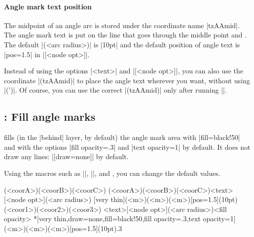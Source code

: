 \paragraph{Angle mark text position}
The midpoint of an angle arc is stored under the coordinate name |tzAAmid|.
The angle mark text is put on the line that goes through the middle point and . The default |(<arc radius>)| is |10pt| and the default position of angle text is |pos=1.5| in |[<node opt>]|.

\begin{tzcode}{.3}
\end{tzcode}

\remark Instead of using the options |{<text>}| and |[<node opt>]|, you can also use the coordinate |(tzAAmid)| to place the angle text wherever you want, without using |\tzanglemark(')|. Of course, you can use the correct |(tzAAmid)| only after running |\tzanglemark|.



\subsection{\protect{}: Fill angle marks}
\label{ss:tzanglemark*}

\icmd{\tzanglemark*} fills (in the |behind| layer, by default) the angle mark area with |fill=black!50| and with the options |fill opacity=.3| and |text opacity=1| by default. It does not draw any lines: |[draw=none]| by default.

Using the macros such as |\settzfillcolor|, |\settzfillopacity|, and \icmd{\settzanglelayer}, you can change the default values.



\begin{tzdef}
\tzanglemark*(<coorA>)(<coorB>)(<coorC>)
\tzanglemark[<opt>](<coorA>)(<coorB>)(<coorC>){<text>}[<node opt>](<arc radius>)
  [very thin](<m>)(<m>)(<m>){}[pos=1.5](10pt)
\tzanglemark*[<opt>](<coor1>)(<coor2>)(<coor3>)
             {<text>}[<node opt>](<arc radius>){<fill opacity>}
  *[very thin,draw=none,fill=black!50,fill opacity=.3,text opacity=1]
   (<m>)(<m>)(<m>){}[pos=1.5](10pt){.3}
\end{tzdef}


